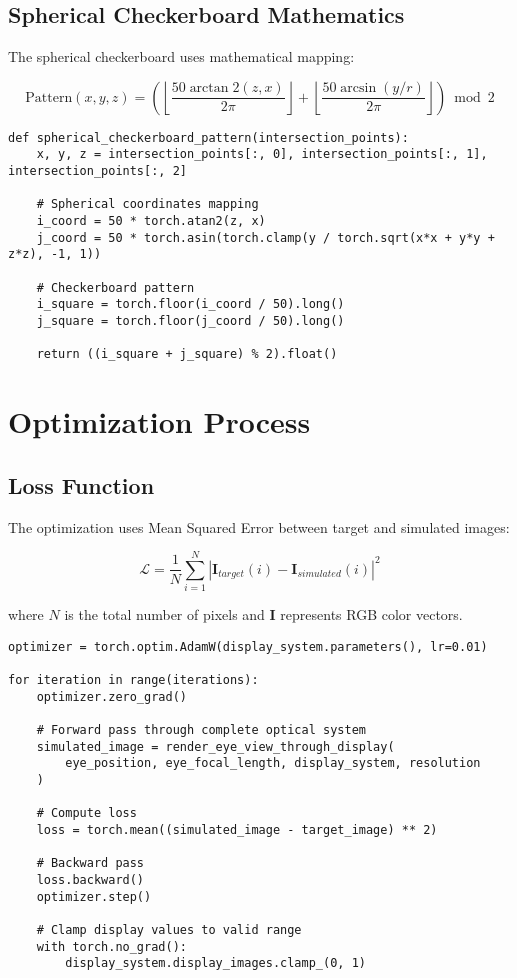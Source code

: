 \documentclass[12pt,a4paper]{article}
\begin{document}
\subsection{Spherical Checkerboard Mathematics}

The spherical checkerboard uses mathematical mapping:

\begin{equation}
\text{Pattern}(x,y,z) = \left( \left\lfloor \frac{50\arctan2(z,x)}{2\pi} \right\rfloor + \left\lfloor \frac{50\arcsin(y/r)}{2\pi} \right\rfloor \right) \bmod 2
\end{equation}

\begin{lstlisting}[caption=Spherical Checkerboard Pattern]
def spherical_checkerboard_pattern(intersection_points):
    x, y, z = intersection_points[:, 0], intersection_points[:, 1], intersection_points[:, 2]
    
    # Spherical coordinates mapping  
    i_coord = 50 * torch.atan2(z, x)
    j_coord = 50 * torch.asin(torch.clamp(y / torch.sqrt(x*x + y*y + z*z), -1, 1))
    
    # Checkerboard pattern
    i_square = torch.floor(i_coord / 50).long()
    j_square = torch.floor(j_coord / 50).long()
    
    return ((i_square + j_square) % 2).float()
\end{lstlisting}

\section{Optimization Process}

\subsection{Loss Function}

The optimization uses Mean Squared Error between target and simulated images:

\begin{equation}
\mathcal{L} = \frac{1}{N} \sum_{i=1}^{N} |\mathbf{I}_{target}(i) - \mathbf{I}_{simulated}(i)|^2
\end{equation}

where $N$ is the total number of pixels and $\mathbf{I}$ represents RGB color vectors.

\begin{lstlisting}[caption=Optimization Loop]
optimizer = torch.optim.AdamW(display_system.parameters(), lr=0.01)

for iteration in range(iterations):
    optimizer.zero_grad()
    
    # Forward pass through complete optical system
    simulated_image = render_eye_view_through_display(
        eye_position, eye_focal_length, display_system, resolution
    )
    
    # Compute loss
    loss = torch.mean((simulated_image - target_image) ** 2)
    
    # Backward pass
    loss.backward()
    optimizer.step()
    
    # Clamp display values to valid range
    with torch.no_grad():
        display_system.display_images.clamp_(0, 1)
\end{lstlisting}
\end{document}
